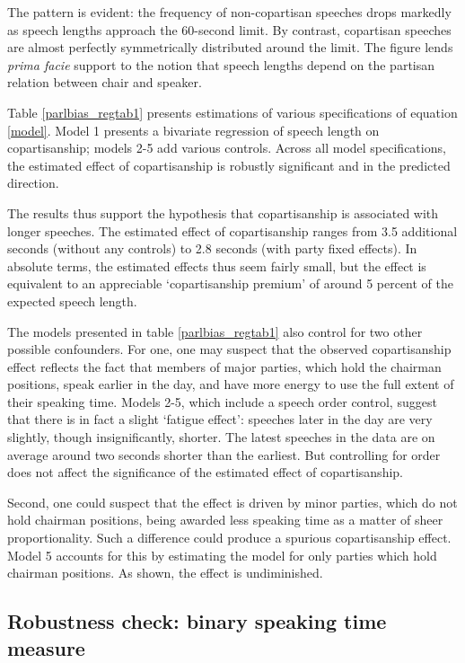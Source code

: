 \documentclass[12pt,a4paper]{article}
\begin{document}
The pattern is evident: the frequency of non-copartisan speeches drops markedly as speech lengths approach the 60-second limit. By contrast, copartisan speeches are almost perfectly symmetrically distributed around the limit. The figure lends \textit{prima facie} support to the notion that speech lengths depend on the partisan relation between chair and speaker.

Table \ref{parlbias_regtab1} presents estimations of various specifications of equation \ref{model}. Model 1 presents a bivariate regression of speech length on copartisanship; models 2-5 add various controls. Across all model specifications, the estimated effect of copartisanship is robustly significant and in the predicted direction. 



The results thus support the hypothesis that copartisanship is associated with longer speeches. The estimated effect of copartisanship ranges from 3.5 additional seconds (without any controls) to 2.8 seconds (with party fixed effects). In absolute terms, the estimated effects thus seem fairly small, but the effect is equivalent to an appreciable `copartisanship premium' of around 5 percent of the expected speech length.

The models presented in table \ref{parlbias_regtab1} also control for two other possible confounders. For one, one may suspect that the observed copartisanship effect reflects the fact that members of major parties, which hold the chairman positions, speak earlier in the day, and have more energy to use the full extent of their speaking time. Models 2-5, which include a speech order control, suggest that there is in fact a slight `fatigue effect': speeches later in the day are very slightly, though insignificantly, shorter. The latest speeches in the data are on average around two seconds shorter than the earliest. But controlling for order does not affect the significance of the estimated effect of copartisanship.

Second, one could suspect that the effect is driven by minor parties, which do not hold chairman positions, being awarded less speaking time as a matter of sheer proportionality. Such a difference could produce a spurious copartisanship effect. Model 5 accounts for this by estimating the model for only parties which hold chairman positions. As shown, the effect is undiminished.

\subsection{Robustness check: binary speaking time measure}
\end{document}
